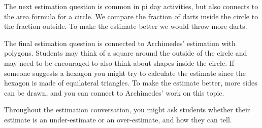 \documentclass[noauthor, nooutcomes, handout]{ximera}
\begin{document}
\begin{instructorNotes}
The next estimation question is common in pi day activities, but also connects to the area formula for a circle. We compare the fraction of darts inside the circle to the fraction outside. To make the estimate better we would throw more darts.

The final estimation question is connected to Archimedes' estimation with polygons. Students may think of a square around the outside of the circle and may need to be encouraged to also think about shapes inside the circle. If someone suggests a hexagon you might try to calculate the estimate since the hexagon is made of equilateral triangles. To make the estimate better, more sides can be drawn, and you can connect to Archimedes' work on this topic.

Throughout the estimation conversation, you might ask students whether their estimate is an under-estimate or an over-estimate, and how they can tell.


\end{instructorNotes}
\end{document}
